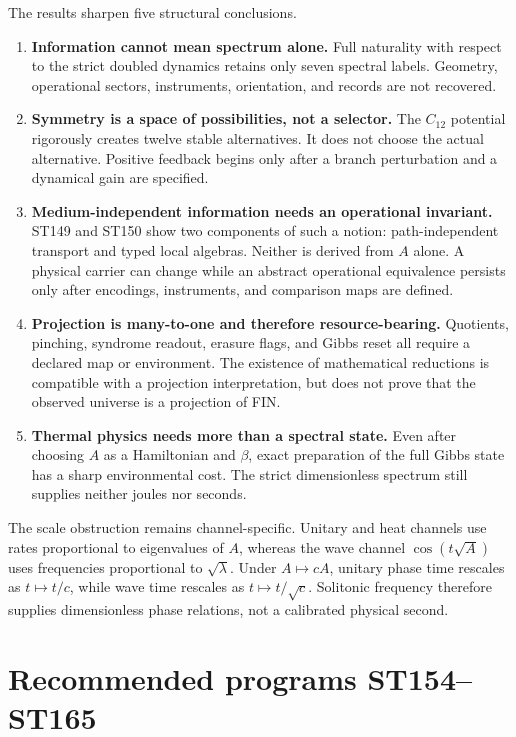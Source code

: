 \documentclass[11pt,a4paper]{article}
\begin{document}
The results sharpen five structural conclusions.

\begin{enumerate}
\item \textbf{Information cannot mean spectrum alone.} Full naturality with respect to the strict doubled dynamics retains only seven spectral labels. Geometry, operational sectors, instruments, orientation, and records are not recovered.
\item \textbf{Symmetry is a space of possibilities, not a selector.} The $C_{12}$ potential rigorously creates twelve stable alternatives. It does not choose the actual alternative. Positive feedback begins only after a branch perturbation and a dynamical gain are specified.
\item \textbf{Medium-independent information needs an operational invariant.} ST149 and ST150 show two components of such a notion: path-independent transport and typed local algebras. Neither is derived from $A$ alone. A physical carrier can change while an abstract operational equivalence persists only after encodings, instruments, and comparison maps are defined.
\item \textbf{Projection is many-to-one and therefore resource-bearing.} Quotients, pinching, syndrome readout, erasure flags, and Gibbs reset all require a declared map or environment. The existence of mathematical reductions is compatible with a projection interpretation, but does not prove that the observed universe is a projection of FIN.
\item \textbf{Thermal physics needs more than a spectral state.} Even after choosing $A$ as a Hamiltonian and $\beta$, exact preparation of the full Gibbs state has a sharp environmental cost. The strict dimensionless spectrum still supplies neither joules nor seconds.
\end{enumerate}

The scale obstruction remains channel-specific. Unitary and heat channels use rates proportional to eigenvalues of $A$, whereas the wave channel $\cos(t\sqrt A)$ uses frequencies proportional to $\sqrt\lambda$. Under $A\mapsto cA$, unitary phase time rescales as $t\mapsto t/c$, while wave time rescales as $t\mapsto t/\sqrt c$. Solitonic frequency therefore supplies dimensionless phase relations, not a calibrated physical second.

\section{Recommended programs ST154--ST165}
\end{document}
